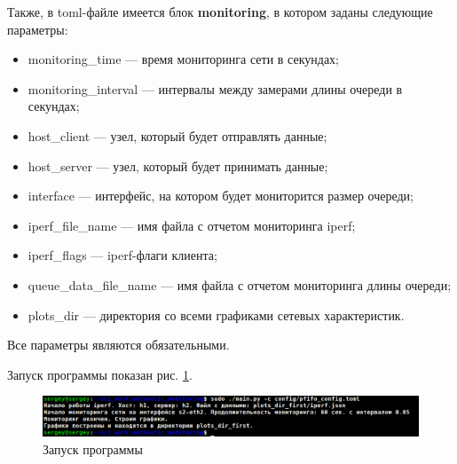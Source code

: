 Также, в toml-файле имеется блок \textbf{monitoring}, в котором заданы
следующие параметры:
\begin{itemize}
\item monitoring\_time --- время мониторинга сети в секундах;
\item monitoring\_interval --- интервалы между замерами длины очереди
  в секундах;
\item host\_client --- узел, который будет отправлять данные;
\item host\_server --- узел, который будет принимать данные;
\item interface --- интерфейс, на котором будет мониторится размер
  очереди;
\item iperf\_file\_name --- имя файла с отчетом мониторинга iperf;
\item iperf\_flags --- iperf-флаги клиента;
\item queue\_data\_file\_name --- имя файла с отчетом мониторинга
  длины очереди;
\item plots\_dir --- директория со всеми графиками сетевых
  характеристик.
\end{itemize}

Все параметры являются обязательными.

Запуск программы показан рис. \ref{fig:30004}.

\begin{figure}[H]
  \centering
  \includegraphics[width=1.0\textwidth]{image/ch03_01/prog_start1.png}
  \caption{Запуск программы}
  \label{fig:30004}
\end{figure}

